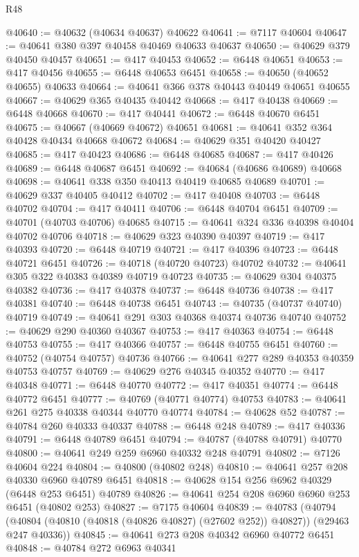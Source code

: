 \begin{lexlean}{R48}
\begin{coremodule}
@40640 := @40632 (@40634 @40637) @40622
@40641 := @7117 @40604
@40647 := @40641 @380 @397 @40458 @40469 @40633 @40637
@40650 := @40629 @379 @40450 @40457
@40651 := @417 @40453
@40652 := @6448 @40651
@40653 := @417 @40456
@40655 := @6448 @40653 @6451
@40658 := @40650 (@40652 @40655) @40633
@40664 := @40641 @366 @378 @40443 @40449 @40651 @40655
@40667 := @40629 @365 @40435 @40442
@40668 := @417 @40438
@40669 := @6448 @40668
@40670 := @417 @40441
@40672 := @6448 @40670 @6451
@40675 := @40667 (@40669 @40672) @40651
@40681 := @40641 @352 @364 @40428 @40434 @40668 @40672
@40684 := @40629 @351 @40420 @40427
@40685 := @417 @40423
@40686 := @6448 @40685
@40687 := @417 @40426
@40689 := @6448 @40687 @6451
@40692 := @40684 (@40686 @40689) @40668
@40698 := @40641 @338 @350 @40413 @40419 @40685 @40689
@40701 := @40629 @337 @40405 @40412
@40702 := @417 @40408
@40703 := @6448 @40702
@40704 := @417 @40411
@40706 := @6448 @40704 @6451
@40709 := @40701 (@40703 @40706) @40685
@40715 := @40641 @324 @336 @40398 @40404 @40702 @40706
@40718 := @40629 @323 @40390 @40397
@40719 := @417 @40393
@40720 := @6448 @40719
@40721 := @417 @40396
@40723 := @6448 @40721 @6451
@40726 := @40718 (@40720 @40723) @40702
@40732 := @40641 @305 @322 @40383 @40389 @40719 @40723
@40735 := @40629 @304 @40375 @40382
@40736 := @417 @40378
@40737 := @6448 @40736
@40738 := @417 @40381
@40740 := @6448 @40738 @6451
@40743 := @40735 (@40737 @40740) @40719
@40749 := @40641 @291 @303 @40368 @40374 @40736 @40740
@40752 := @40629 @290 @40360 @40367
@40753 := @417 @40363
@40754 := @6448 @40753
@40755 := @417 @40366
@40757 := @6448 @40755 @6451
@40760 := @40752 (@40754 @40757) @40736
@40766 := @40641 @277 @289 @40353 @40359 @40753 @40757
@40769 := @40629 @276 @40345 @40352
@40770 := @417 @40348
@40771 := @6448 @40770
@40772 := @417 @40351
@40774 := @6448 @40772 @6451
@40777 := @40769 (@40771 @40774) @40753
@40783 := @40641 @261 @275 @40338 @40344 @40770 @40774
@40784 := @40628 @52
@40787 := @40784 @260 @40333 @40337
@40788 := @6448 @248
@40789 := @417 @40336
@40791 := @6448 @40789 @6451
@40794 := @40787 (@40788 @40791) @40770
@40800 := @40641 @249 @259 @6960 @40332 @248 @40791
@40802 := @7126 @40604 @224
@40804 := @40800 (@40802 @248)
@40810 := @40641 @257 @208 @40330 @6960 @40789 @6451
@40818 := @40628 @154 @256 @6962 @40329 (@6448 @253 @6451) @40789
@40826 := @40641 @254 @208 @6960 @6960 @253 @6451 (@40802 @253)
@40827 := @7175 @40604
@40839 := @40783
    (@40794 (@40804 (@40810 (@40818 (@40826 @40827) (@27602 @252)) @40827)) (@29463 @247 @40336))
@40845 := @40641 @273 @208 @40342 @6960 @40772 @6451
@40848 := @40784 @272 @6963 @40341

\end{coremodule}
\end{lexlean}
